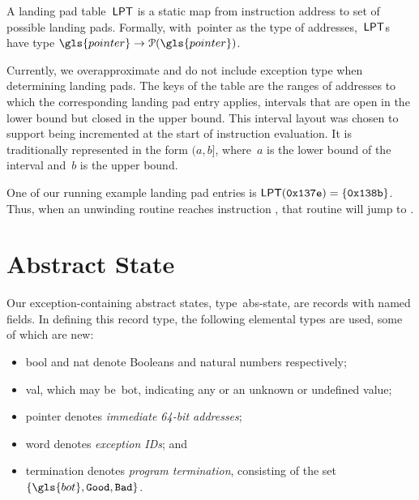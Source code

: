 \begin{definition}
  A landing pad table~$\operatorname{\mathsf{LPT}}$ is a static map from instruction address to set of possible landing pads.
  Formally, with~\gls{pointer} as the type of addresses,~$\operatorname{\mathsf{LPT}}$s have type $\gls{pointer}\to\powerset(\gls{pointer})$.
\end{definition}
Currently, we overapproximate and do not include exception type when determining landing pads.
The keys of the table are the ranges of addresses to which the corresponding landing pad entry applies, intervals that are open in the lower bound but closed in the upper bound. This interval layout was chosen to support \rip being incremented at the start of instruction evaluation. It is traditionally represented in the form $(a,b]$, where~$a$ is the lower bound of the interval and~$b$ is the upper bound.
\begin{example}\label{ex:landing-pad-table}
  One of our running example landing pad entries is  $\operatorname{\mathsf{LPT}}(\mathtt{0x137e})=\{\mathtt{0x138b}\}$.
  Thus, when an unwinding routine reaches instruction , %
  that routine will jump to .
\end{example}

\section{Abstract State}\label{sec:abstract-state}
Our exception-containing abstract states, type~\gls{abs-state}, are records with named fields.
In defining this record type, the following elemental types are used, some of which are new:
\begin{itemize} %
  \item \Gls{bool} and \gls{nat} denote Booleans and natural numbers respectively;
  \item \Gls{val},
  which may be~\gls{bot}, indicating any or an unknown or undefined value;
  \item \Gls{pointer} denotes \emph{immediate 64-bit addresses};
  \item \Gls{word} denotes \emph{exception IDs}; and
  \item \Gls{termination} denotes \emph{program termination}, consisting of the set $\{\gls{bot},\good,\bad\}$.
\end{itemize}

